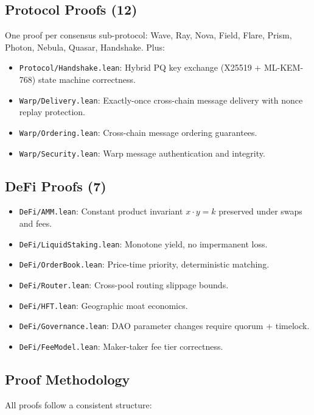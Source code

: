 \documentclass[11pt,letterpaper]{article}
\begin{document}
\subsection{Protocol Proofs (12)}

One proof per consensus sub-protocol: Wave, Ray, Nova, Field, Flare, Prism, Photon, Nebula, Quasar, Handshake. Plus:

\begin{itemize}
\item \texttt{Protocol/Handshake.lean}: Hybrid PQ key exchange (X25519 + ML-KEM-768) state machine correctness.
\item \texttt{Warp/Delivery.lean}: Exactly-once cross-chain message delivery with nonce replay protection.
\item \texttt{Warp/Ordering.lean}: Cross-chain message ordering guarantees.
\item \texttt{Warp/Security.lean}: Warp message authentication and integrity.
\end{itemize}

\subsection{DeFi Proofs (7)}

\begin{itemize}
\item \texttt{DeFi/AMM.lean}: Constant product invariant $x \cdot y = k$ preserved under swaps and fees.
\item \texttt{DeFi/LiquidStaking.lean}: Monotone yield, no impermanent loss.
\item \texttt{DeFi/OrderBook.lean}: Price-time priority, deterministic matching.
\item \texttt{DeFi/Router.lean}: Cross-pool routing slippage bounds.
\item \texttt{DeFi/HFT.lean}: Geographic moat economics.
\item \texttt{DeFi/Governance.lean}: DAO parameter changes require quorum + timelock.
\item \texttt{DeFi/FeeModel.lean}: Maker-taker fee tier correctness.
\end{itemize}

\subsection{Proof Methodology}

All proofs follow a consistent structure:
\end{document}
